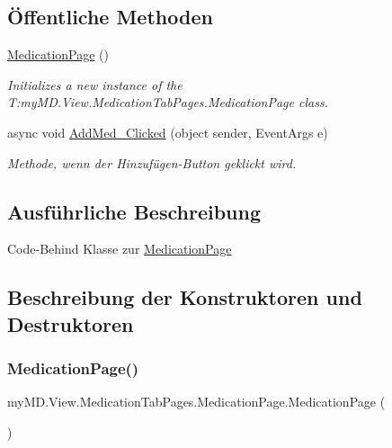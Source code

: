 \subsection*{Öffentliche Methoden}
\begin{DoxyCompactItemize}
\item 
\mbox{\hyperlink{classmy_m_d_1_1_view_1_1_medication_tab_pages_1_1_medication_page_a99467ba42e4ccde63fea9ba2dd04f7cc}{Medication\+Page}} ()
\begin{DoxyCompactList}\small\item\em Initializes a new instance of the T\+:my\+M\+D.\+View.\+Medication\+Tab\+Pages.\+Medication\+Page class. \end{DoxyCompactList}\item 
async void \mbox{\hyperlink{classmy_m_d_1_1_view_1_1_medication_tab_pages_1_1_medication_page_a8f462e0f3c47fc90db5745284f1186e8}{Add\+Med\+\_\+\+Clicked}} (object sender, Event\+Args e)
\begin{DoxyCompactList}\small\item\em Methode, wenn der Hinzufügen-\/\+Button geklickt wird. \end{DoxyCompactList}\end{DoxyCompactItemize}


\subsection{Ausführliche Beschreibung}
Code-\/\+Behind Klasse zur \mbox{\hyperlink{classmy_m_d_1_1_view_1_1_medication_tab_pages_1_1_medication_page}{Medication\+Page}} 



\subsection{Beschreibung der Konstruktoren und Destruktoren}
\mbox{\label{classmy_m_d_1_1_view_1_1_medication_tab_pages_1_1_medication_page_a99467ba42e4ccde63fea9ba2dd04f7cc}} 
\subsubsection{\texorpdfstring{Medication\+Page()}{MedicationPage()}}
{\footnotesize\ttfamily my\+M\+D.\+View.\+Medication\+Tab\+Pages.\+Medication\+Page.\+Medication\+Page (\begin{DoxyParamCaption}{ }\end{DoxyParamCaption})}



